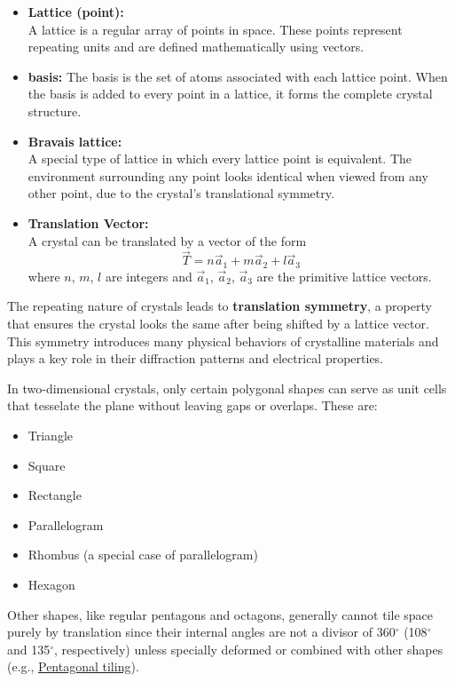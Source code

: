 \documentclass[12pt,a4paper]{article}
\begin{document}
\begin{CJK}{UTF8}{bkai}
\begin{itemize}
    \item \textbf{Lattice (point):}\\
    A lattice is a regular array of points in space. These points represent repeating units and are defined mathematically using vectors.
    \item \textbf{basis:} The basis is the set of atoms associated with each lattice point. When the basis is added to every point in a lattice, it forms the complete crystal structure.
    \item \textbf{Bravais lattice:}\\
    A special type of lattice in which every lattice point is equivalent. The environment surrounding any point looks identical when viewed from any other point, due to the crystal’s translational symmetry.
    \item \textbf{Translation Vector:}\\
    A crystal can be translated by a vector of the form
    \begin{equation}
        \vec{T} = n\vec{a}_1+m\vec{a}_2+l\vec{a}_3
    \end{equation}
    where $n$, $m$, $l$ are integers and $\vec{a}_1$, $\vec{a}_2$, $\vec{a}_3$ are the primitive lattice vectors.
\end{itemize}

The repeating nature of crystals leads to \textbf{translation symmetry}, a property that ensures the crystal looks the same after being shifted by a lattice vector. This symmetry introduces many physical behaviors of crystalline materials and plays a key role in their diffraction patterns and electrical properties.

In two-dimensional crystals, only certain polygonal shapes can serve as unit cells that tesselate the plane without leaving gaps or overlaps. These are:
\begin{itemize}
    \item Triangle
    \item Square
    \item Rectangle
    \item Parallelogram
    \item Rhombus (a special case of parallelogram)
    \item Hexagon
\end{itemize}

Other shapes, like regular pentagons and octagons, generally cannot tile space purely by translation since their internal angles are not a divisor of 360$^\circ$ (108$^\circ$ and 135$^\circ$, respectively) unless specially deformed or combined with other shapes (e.g., \href{https://en.wikipedia.org/wiki/Pentagonal_tiling}{Pentagonal tiling}).


\end{CJK}
\end{document}
